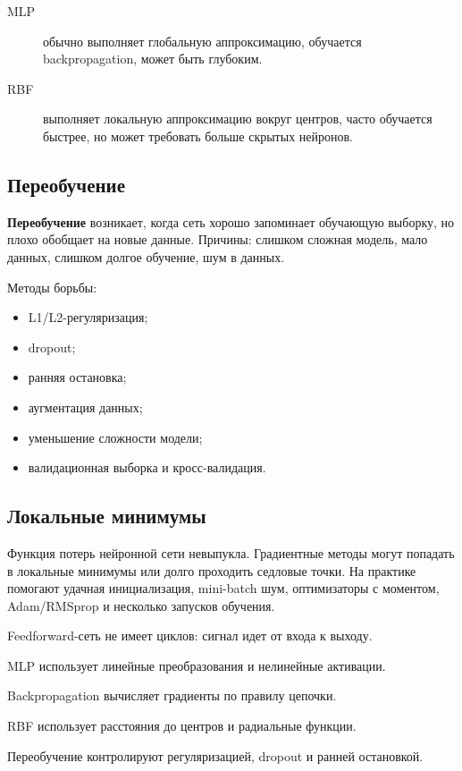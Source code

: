 \begin{description}
    \item[MLP] обычно выполняет глобальную аппроксимацию, обучается backpropagation, может быть глубоким.
    \item[RBF] выполняет локальную аппроксимацию вокруг центров, часто обучается быстрее, но может требовать больше скрытых нейронов.
\end{description}

\subsection*{Переобучение}

\textbf{Переобучение} возникает, когда сеть хорошо запоминает обучающую выборку, но плохо обобщает на новые данные. Причины: слишком сложная модель, мало данных, слишком долгое обучение, шум в данных.

Методы борьбы:
\begin{itemize}
    \item L1/L2-регуляризация;
    \item dropout;
    \item ранняя остановка;
    \item аугментация данных;
    \item уменьшение сложности модели;
    \item валидационная выборка и кросс-валидация.
\end{itemize}

\subsection*{Локальные минимумы}

Функция потерь нейронной сети невыпукла. Градиентные методы могут попадать в локальные минимумы или долго проходить седловые точки. На практике помогают удачная инициализация, mini-batch шум, оптимизаторы с моментом, Adam/RMSprop и несколько запусков обучения.

\begin{important}
    \item Feedforward-сеть не имеет циклов: сигнал идет от входа к выходу.
    \item MLP использует линейные преобразования и нелинейные активации.
    \item Backpropagation вычисляет градиенты по правилу цепочки.
    \item RBF использует расстояния до центров и радиальные функции.
    \item Переобучение контролируют регуляризацией, dropout и ранней остановкой.
\end{important}
